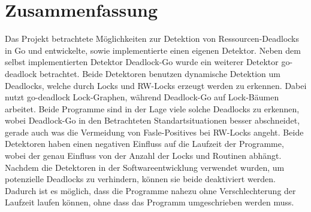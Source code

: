 \chapter{Zusammenfassung}
Das Projekt betrachtete Möglichkeiten zur Detektion von Ressourcen-Deadlocks
in Go und entwickelte, sowie implementierte einen eigenen Detektor. Neben dem 
selbst implementierten Detektor Deadlock-Go wurde ein weiterer Detektor go-deadlock
betrachtet. Beide Detektoren benutzen dynamische Detektion um Deadlocks, welche 
durch Locks und RW-Locks erzeugt werden zu erkennen. Dabei nutzt go-deadlock 
Lock-Graphen, während Deadlock-Go auf Lock-Bäumen arbeitet. Beide Programme sind 
in der Lage viele solche Deadlocks zu erkennen, wobei Deadlock-Go in den 
Betrachteten Standartsituationen besser abschneidet, gerade auch was die
Vermeidung von Fasle-Positives bei RW-Locks angeht. Beide Detektoren 
haben einen negativen Einfluss auf die Laufzeit der Programme, wobei der 
genau Einfluss von der Anzahl der Locks und Routinen abhängt.
Nachdem die Detektoren in der Softwareentwicklung verwendet wurden, um potenzielle 
Deadlocks zu verhindern, können sie beide deaktiviert werden. Dadurch ist es 
möglich, dass die Programme nahezu ohne Verschlechterung der Laufzeit laufen 
können, ohne dass das Programm umgeschrieben werden muss.